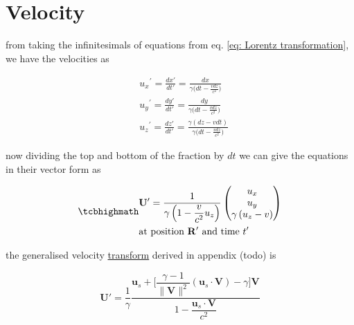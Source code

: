 \section{Velocity}

from taking the infinitesimals of equations from eq. \eqref{eq: Lorentz transformation}, we have the velocities as

\begin{equation}
	\begin{aligned}
		 & {{u}_{x}}^{'} = \frac{dx{'}}{dt{'}}=\frac{dx}{{\gamma} \bigg(dt-\frac{vdz}{c^2}\bigg) }                  \\
		 & {{u}_{y}}^{'} = \frac{dy{'}}{dt{'}}=\frac{dy}{{\gamma} \bigg(dt-\frac{vdz}{c^2}\bigg) }                  \\
		 & {{u}_{z}}^{'} = \frac{dz{'}}{dt{'}} = \frac{{\gamma} (dz-vdt)}{{\gamma} \bigg(dt-\frac{vdz}{c^2}\bigg) }
	\end{aligned}
\end{equation}

now dividing the top and bottom of the fraction by $dt$ we can give the equations in their vector form as

\begin{equation}
	\label{eq: velocity transform}
	\mhl{
		\begin{aligned}
			 & \mathbf{U}{'} = \dfrac{1}{{\gamma}\left(1- \dfrac{v}{c^2} {{u}_{z}}\right) }
			\begin{pmatrix}
				{{u}_{x}}                             \\
				{{u}_{y}}                             \\
				{\gamma} \left( {{u}_{z}} - v \right) \\
			\end{pmatrix}
			\\
			 & \text{at position $\mathbf{R}{'}$ and time $t{'}$ }
		\end{aligned}
	}
\end{equation}

the generalised velocity \hyperlink{def-transform}{transform} derived in appendix (todo) is

\begin{equation}
	\mathbf{U}{'} = \dfrac{1}{{\gamma}} \dfrac{\mathbf{u}_s + \Big[\dfrac{{\gamma}-1}{\|\mathbf{V}\|^2}(\mathbf{u}_s\cdot \mathbf{V})- {\gamma} \Big] \mathbf{V}}{1 - \dfrac{\mathbf{u}_s\cdot\mathbf{V}}{c^2}}
\end{equation}

